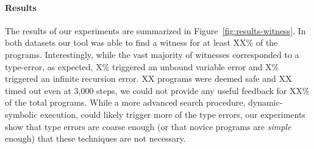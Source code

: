 \paragraph{Results}
\label{sec:results-witness}
The results of our experiments are summarized in
Figure~\ref{fig:results-witness}.
%
In both datasets our tool was able to find a witness for at least XX\%
of the programs.
%
Interestingly, while the vast majority of witnesses corresponded to a
type-error, as expected, X\% triggered an unbound variable error and X\%
triggered an infinite recursion error.
%
XX programs were deemed safe and XX timed out even at 3,000 steps, \ie
we could not provide any useful feedback for XX\% of the total programs.
%
While a more advanced search procedure, \eg dynamic-symbolic execution,
could likely trigger more of the type errors, our experiments show that
type errors are coarse enough (or that novice programs are \emph{simple}
enough) that these techniques are not necessary.



